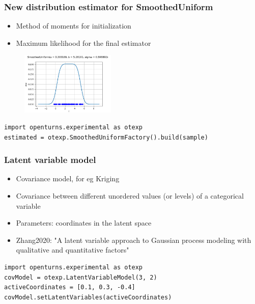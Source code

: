 \documentclass[aspectratio=169]{beamer}
\begin{document}

\begin{frame}[containsverbatim]
\frametitle{New distribution estimator for SmoothedUniform}

\begin{itemize}
\item Method of moments for initialization
\item Maximum likelihood for the final estimator
\end{itemize}

\begin{figure}
   \includegraphics[width=0.4\textwidth]{figures/SmoothedUniformFactory}
\end{figure}

\begin{small}
\begin{lstlisting}
import openturns.experimental as otexp
estimated = otexp.SmoothedUniformFactory().build(sample)
\end{lstlisting}
\end{small}


\end{frame}


\begin{frame}[containsverbatim]
\frametitle{Latent variable model}

\begin{itemize}
\item Covariance model, for eg Kriging
\item Covariance between different unordered values (or levels) of a categorical variable
\item Parameters: coordinates in the latent space
\item Zhang2020: "A latent variable approach to Gaussian process modeling with qualitative and quantitative factors"
\end{itemize}

\vspace{30pt}

\begin{small}
\begin{lstlisting}
import openturns.experimental as otexp
covModel = otexp.LatentVariableModel(3, 2)
activeCoordinates = [0.1, 0.3, -0.4]
covModel.setLatentVariables(activeCoordinates)
\end{lstlisting}
\end{small}

\end{frame}
\end{document}

